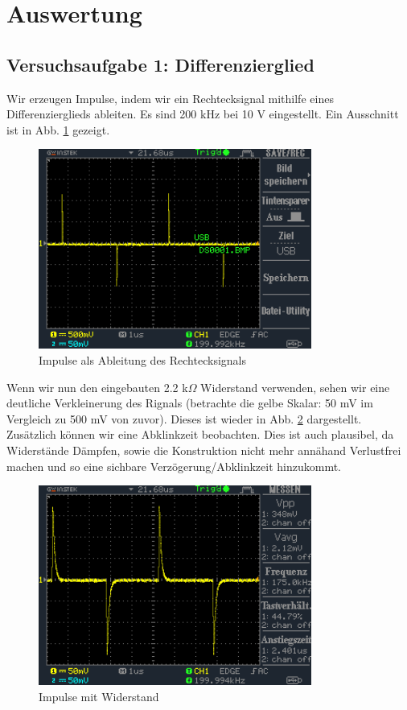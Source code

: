 \documentclass[a4paper,12pt,twocoloumn]{article}
\numberwithin{equation}{section}
\begin{document}
\newpage
\section{Auswertung}

\subsection{Versuchsaufgabe 1: Differenzierglied}
Wir erzeugen Impulse, indem wir ein Rechtecksignal mithilfe eines Differenzierglieds ableiten. Es sind 200 kHz bei 10 V eingestellt. Ein Ausschnitt ist in Abb. \ref{fig:1.1} gezeigt.
\begin{figure}[h]
        \centering
        \includegraphics[width=0.8\textwidth]{data/DS0001.BMP.png}
        \caption{Impulse als Ableitung des Rechtecksignals}
		\label{fig:1.1}
\end{figure}
Wenn wir nun den eingebauten 2.2 k$\Omega$ Widerstand verwenden, sehen wir eine deutliche Verkleinerung des Rignals (betrachte die gelbe Skalar: 50 mV im Vergleich zu 500 mV von zuvor). Dieses ist wieder in Abb. \ref{fig:1.2} dargestellt. Zusätzlich können wir eine Abklinkzeit beobachten. Dies ist auch plausibel, da Widerstände Dämpfen, sowie die Konstruktion nicht mehr annähand Verlustfrei machen und so eine sichbare Verzögerung/Abklinkzeit hinzukommt.
\begin{figure}[h]
        \centering
        \includegraphics[width=0.8\textwidth]{data/DS0003.BMP.png}
        \caption{Impulse mit Widerstand}
		\label{fig:1.2}
\end{figure}
\end{document}
